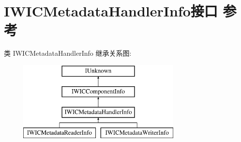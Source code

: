 \hypertarget{interface_i_w_i_c_metadata_handler_info}{}\section{I\+W\+I\+C\+Metadata\+Handler\+Info接口 参考}
\label{interface_i_w_i_c_metadata_handler_info}
类 I\+W\+I\+C\+Metadata\+Handler\+Info 继承关系图\+:\begin{figure}[H]
\begin{center}
\leavevmode
\includegraphics[height=4.000000cm]{interface_i_w_i_c_metadata_handler_info}
\end{center}
\end{figure}
